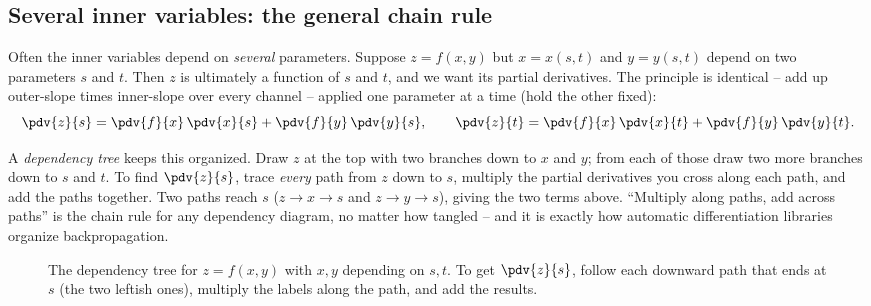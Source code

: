\subsection{Several inner variables: the general chain rule}

Often the inner variables depend on \emph{several} parameters. Suppose
$z=f(x,y)$ but $x=x(s,t)$ and $y=y(s,t)$ depend on two parameters $s$ and $t$.
Then $z$ is ultimately a function of $s$ and $t$, and we want its partial
derivatives. The principle is identical -- add up outer-slope times inner-slope
over every channel -- applied one parameter at a time (hold the other fixed):
\[
  \pdv{z}{s} = \pdv{f}{x}\,\pdv{x}{s} + \pdv{f}{y}\,\pdv{y}{s},
  \qquad
  \pdv{z}{t} = \pdv{f}{x}\,\pdv{x}{t} + \pdv{f}{y}\,\pdv{y}{t}.
\]

\begin{intuitionbox}
A \emph{dependency tree} keeps this organized. Draw $z$ at the top with two
branches down to $x$ and $y$; from each of those draw two more branches down to
$s$ and $t$. To find $\pdv{z}{s}$, trace \emph{every} path from $z$ down to $s$,
multiply the partial derivatives you cross along each path, and add the paths
together. Two paths reach $s$ ($z\!\to\!x\!\to\!s$ and $z\!\to\!y\!\to\!s$),
giving the two terms above. ``Multiply along paths, add across paths'' is the
chain rule for any dependency diagram, no matter how tangled -- and it is exactly
how automatic differentiation libraries organize backpropagation.
\end{intuitionbox}

\begin{figure}[H]
\centering
{}
\caption{The dependency tree for $z=f(x,y)$ with $x,y$ depending on $s,t$. To get
$\pdv{z}{s}$, follow each downward path that ends at $s$ (the two leftish ones),
multiply the labels along the path, and add the results.}
\label{ch33:fig-tree}
\end{figure}

